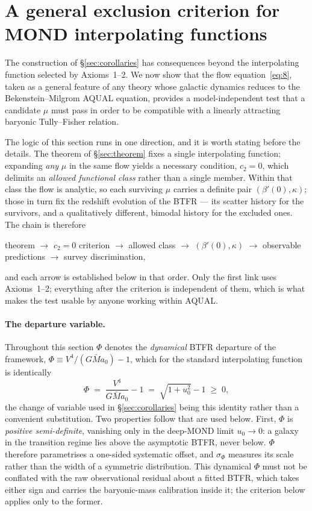 \documentclass[11pt]{article}
\theoremstyle{plain}
\begin{document}
\section{A general exclusion criterion for MOND interpolating functions}
\label{sec:general-criterion}

The construction of \S\ref{sec:corollaries} has consequences beyond the
interpolating function selected by Axioms~1--2. We now show that the flow
equation~\eqref{eq:8}, taken as a general feature of any theory whose galactic
dynamics reduces to the Bekenstein--Milgrom AQUAL equation, provides a
model-independent test that a candidate $\mu$ must pass in order to be
compatible with a linearly attracting baryonic Tully--Fisher relation.

The logic of this section runs in one direction, and it is worth stating before
the details. The theorem of \S\ref{sec:theorem} fixes a single interpolating
function; expanding \emph{any} $\mu$ in the same flow yields a necessary
condition, $c_{2}=0$, which delimits an \emph{allowed functional class} rather
than a single member. Within that class the flow is analytic, so each surviving
$\mu$ carries a definite pair $(\beta'(0),\kappa)$; those in turn fix the
redshift evolution of the BTFR --- its scatter history for the survivors, and a
qualitatively different, bimodal history for the excluded ones. The chain is
therefore
\begin{center}
theorem $\rightarrow$ $c_{2}=0$ criterion $\rightarrow$ allowed class
$\rightarrow$ $(\beta'(0),\kappa)$ $\rightarrow$ observable predictions
$\rightarrow$ survey discrimination,
\end{center}
and each arrow is established below in that order. Only the first link uses
Axioms~1--2; everything after the criterion is independent of them, which is
what makes the test usable by anyone working within AQUAL.

\paragraph{The departure variable.} Throughout this section $\Phi$ denotes the
\emph{dynamical} BTFR departure of the framework,
$\Phi\equiv V^{4}/(G\bar M a_{0})-1$, which for the standard interpolating
function is identically
\begin{equation*}\tag{11}\label{eq:phi-identity}
\Phi \;=\; \frac{V^{4}}{G\bar M a_{0}} - 1 \;=\; \sqrt{1+u_{0}^{2}}-1 \;\ge\; 0,
\end{equation*}
the change of variable used in \S\ref{sec:corollaries} being this identity
rather than a convenient substitution. Two properties follow that are used
below. First, $\Phi$ is \emph{positive semi-definite}, vanishing only in the
deep-MOND limit $u_{0}\to0$: a galaxy in the transition regime lies above the
asymptotic BTFR, never below. $\Phi$ therefore parametrises a one-sided
systematic offset, and $\sigma_{\Phi}$ measures its scale rather than the width
of a symmetric distribution. This dynamical $\Phi$ must not be conflated with
the raw observational residual about a fitted BTFR, which takes either sign and
carries the baryonic-mass calibration inside it; the criterion below applies
only to the former.
\end{document}
